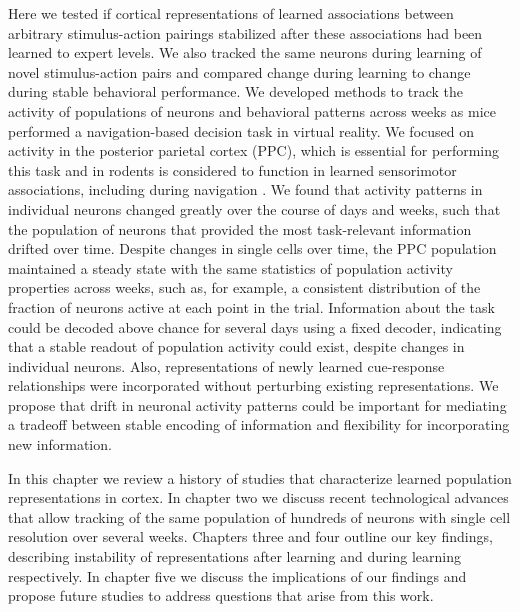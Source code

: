 Here we tested if cortical representations of learned associations between arbitrary stimulus-action pairings stabilized after these associations had been learned to expert levels. We also tracked the same neurons during learning of novel stimulus-action pairs and compared change during learning to change during stable behavioral performance. We developed methods to track the activity of populations of neurons and behavioral patterns across weeks as mice performed a navigation-based decision task in virtual reality. We focused on activity in the posterior parietal cortex (PPC), which is essential for performing this task and in rodents is considered to function in learned sensorimotor associations, including during navigation \citep{Harvey:2012du, McNaughton1994, Nitz2006, Whitlock2012}. We found that activity patterns in individual neurons changed greatly over the course of days and weeks, such that the population of neurons that provided the most task-relevant information drifted over time. Despite changes in single cells over time, the PPC population maintained a steady state with the same statistics of population activity properties across weeks, such as, for example, a consistent distribution of the fraction of neurons active at each point in the trial. Information about the task could be decoded above chance for several days using a fixed decoder, indicating that a stable readout of population activity could exist, despite changes in individual neurons. Also, representations of newly learned cue-response relationships were incorporated without perturbing existing representations. We propose that drift in neuronal activity patterns could be important for mediating a tradeoff between stable encoding of information and flexibility for incorporating new information.

\bigskip

In this chapter we review a history of studies that characterize learned population representations in cortex. In chapter two we discuss recent technological advances that allow tracking of the same population of hundreds of neurons with single cell resolution over several weeks. Chapters three and four outline our key findings, describing instability of representations after learning and during learning respectively. In chapter five we discuss the implications of our findings and propose future studies to address questions that arise from this work.

